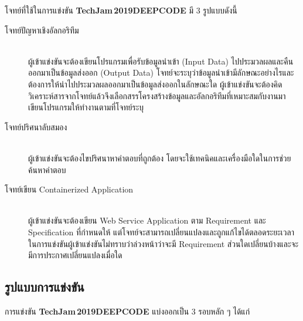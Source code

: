 \noindent
โจทย์ที่ใช้ในการแข่งขัน \textbf{TechJam\,2019\:DEEP\:CODE} มี 3 รูปแบบดังนี้ 

\begin{description}
\item[\textthai{โจทย์ปัญหาเชิงอัลกอริทึม}] \phantom{anchor} \\
    ผู้เข้าแข่งขันจะต้องเขียนโปรแกรมเพื่อรับข้อมูลนำเข้า ({\hrsp}Input Data{\hrsp}) ไปประมวลผลและคืนออกมาเป็นข้อมูลส่งออก ({\hrsp}Output Data{\hrsp})\;\;
    โจทย์จะระบุว่าข้อมูลนำเข้ามีลักษณะอย่างไรและต้องการให้นำไปประมวลผลออกมาเป็นข้อมูลส่งออกในลักษณะใด\;\;
    ผู้เข้าแข่งขันจะต้องคิดวิเคราะห์สารจากโจทย์แล้วจึงเลือกสรรโครงสร้างข้อมูลและอัลกอริทึมที่เหมาะสมกับงานมาเขียนโปรแกรมให้ทำงานตามที่โจทย์ระบุ
    
\item[\textthai{โจทย์ปริศนาลับสมอง}] \phantom{anchor} \\
    ผู้เข้าแข่งขันจะต้องไขปริศนาหาคำตอบที่ถูกต้อง โดยจะใช้เทคนิคและเครื่องมือใดในการช่วยค้นหาคำตอบ

\item[\textthai{โจทย์เขียน Containerized Application}] \phantom{anchor} \\
    ผู้เข้าแข่งขันจะต้องเขียน Web Service Application ตาม Requirement และ Specification ที่กำหนดให้\;\;
    แต่โจทย์จะสามารถเปลี่ยนแปลงและถูกแก้ไขได้ตลอดระยะเวลาในการแข่งขัน\;\;ผู้เข้าแข่งขันไม่ทราบว่าล่วงหน้าว่าจะมี Requirement ส่วนใดเปลี่ยนบ้าง\:และจะมีการประกาศเปลี่ยนแปลงเมื่อใด
\end{description}


\medskip
{}
\subsection*{รูปแบบการแข่งขัน}

\noindent
การแข่งขัน \textbf{TechJam\,2019\:DEEP\:CODE} แบ่งออกเป็น 3 รอบหลัก ๆ ได้แก่

